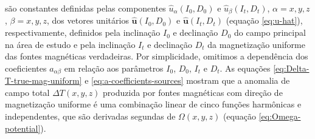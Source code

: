 são constantes definidas pelas componentes $\hat{u}_{\alpha}(I_{0}, D_{0})$ e $\hat{u}_{\beta}(I_{t}, D_{t})$, 
$\alpha = x, y, z$, $\beta = x, y, z$, dos vetores unitários $\hat{\mathbf{u}}(I_{0}, D_{0})$ e 
$\hat{\mathbf{u}}(I_{t}, D_{t})$ (equação \ref{eq:u-hat}), respectivamente,
definidos pela inclinação $I_{0}$ e declinação $D_{0}$ do campo principal na área de estudo e 
pela inclinação $I_{t}$ e declinação $D_{t}$ da magnetização uniforme das fontes magnéticas 
verdadeiras. 
Por simplicidade, omitimos a dependência dos coeficientes $a_{\alpha\beta}$ em relação aos parâmetros 
$I_{0}$, $D_{0}$, $I_{t}$ e $D_{t}$.
As equações \ref{eq:Delta-T-true-mag-uniform} e \ref{eq:a-coefficients-sources} mostram que a anomalia de campo 
total $\Delta T(x, y, z)$ produzida por fontes magnéticas com direção de magnetização uniforme é 
uma combinação linear de cinco funções harmônicas e independentes, que são derivadas segundas 
de $\Omega(x, y, z)$ (equação \ref{eq:Omega-potential}).

